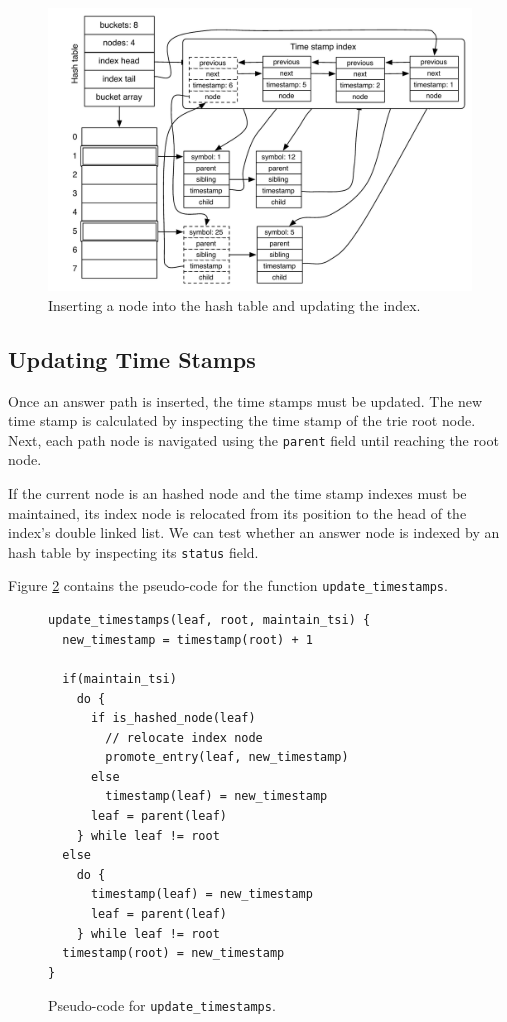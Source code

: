 \begin{figure}[ht]
  \centering
    \includegraphics[scale=0.6]{hash_table_insert.pdf}
  \caption{Inserting a node into the hash table and updating the index.}
  \label{fig:hash_table_insert}
\end{figure}

\subsection{Updating Time Stamps}

Once an answer path is inserted, the time stamps must be updated.
The new time stamp is calculated by inspecting the time stamp of the trie root node.
Next, each path node is navigated using the \texttt{parent} field until reaching the root node.

If the current node is an hashed node and the time stamp indexes
must be maintained, its index node is relocated from its position to the head of
the index's double linked list. We can test whether an answer node is indexed by
an hash table by inspecting its \texttt{status} field.

Figure \ref{fig:update_timestamps} contains the pseudo-code for the function \texttt{update\_timestamps}.

\begin{figure}[ht]
\begin{Verbatim}
update_timestamps(leaf, root, maintain_tsi) {
  new_timestamp = timestamp(root) + 1
  
  if(maintain_tsi)
    do {
      if is_hashed_node(leaf)
        // relocate index node
        promote_entry(leaf, new_timestamp)
      else
        timestamp(leaf) = new_timestamp
      leaf = parent(leaf)
    } while leaf != root
  else
    do {
      timestamp(leaf) = new_timestamp
      leaf = parent(leaf)
    } while leaf != root
  timestamp(root) = new_timestamp
}
\end{Verbatim}
\caption{Pseudo-code for \texttt{update\_timestamps}.}
\label{fig:update_timestamps}
\end{figure}

